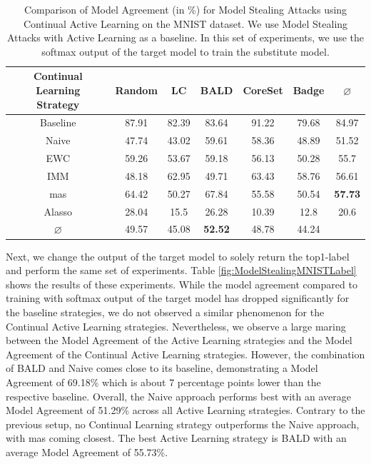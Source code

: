 \begin{table}[h]
    \centering
    \begin{tabular}{c | c c c c c | c } 
        \hline
        \diagbox[width=11em]{Active \\ Learning Strategy}{Continual Learning \\ Strategy} & Random & LC & BALD & CoreSet & Badge & $\varnothing$\\ 
        \hline 
        Baseline & 87.91 & 82.39 & 83.64 & 91.22 & 79.68 & 84.97\\
        \hline
        Naive & 47.74 & 43.02 & 59.61 & 58.36 & 48.89 & 51.52\\
        EWC &  59.26 & 53.67 & 59.18 & 56.13 & 50.28 & 55.7\\
        IMM & 48.18 & 62.95 & 49.71 & 63.43 & 58.76 & 56.61 \\
        \gls{mas} &  64.42 & 50.27 & 67.84 & 55.58 & 50.54 & \textbf{57.73}\\
        Alasso & 28.04 & 15.5 & 26.28 & 10.39 & 12.8 & 20.6\\
        \hline
        $\varnothing$ & 49.57 & 45.08 & \textbf{52.52} & 48.78 & 44.24 & \\
        \hline
    \end{tabular}
    \caption{Comparison of Model Agreement (in \%) for Model Stealing Attacks using Continual Active Learning on the MNIST dataset. We use Model Stealing Attacks with Active Learning as a baseline. In this set of experiments,
    we use the softmax output of the target model to train the substitute model.}
    \label{fig:ModelStealingMNISTSoftmax}
\end{table}

Next, we change the output of the target model to solely return the top1-label and perform the same set of experiments. Table \ref{fig:ModelStealingMNISTLabel} shows the results of these experiments. While the model agreement compared to training with softmax output of the
target model has dropped significantly for the baseline strategies, we do not observed a similar phenomenon for the Continual Active Learning strategies. Nevertheless, we observe a large maring between the Model Agreement of the Active Learning strategies and the Model Agreement
of the Continual Active Learning strategies. However, the combination of BALD and Naive comes close to its baseline, demonstrating a Model Agreement of 69.18\% which is about 7 percentage points lower than the respective baseline. Overall, the Naive approach performs best with an
average Model Agreement of 51.29\% across all Active Learning strategies. Contrary to the previous setup, no Continual Learning strategy outperforms the Naive approach, with \gls{mas} coming closest. The best Active Learning strategy is BALD with an average Model Agreement of 55.73\%. \par 

